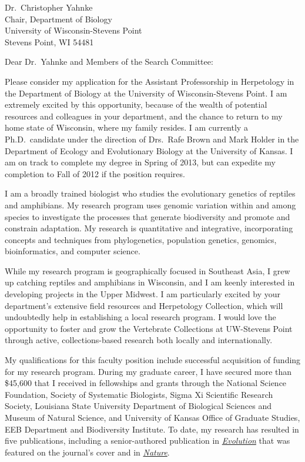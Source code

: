 \documentclass[letterpaper, 10pt]{letter}
\begin{document}
\begin{letter}{Dr.\ Christopher Yahnke \\
                     Chair, Department of Biology \\
                     University of Wisconsin-Stevens Point \\
                     Stevens Point, WI  54481}
\opening{Dear Dr.\ Yahnke and Members of the Search Committee:}
\raggedright
Please consider my application for the Assistant Professorship in Herpetology in the Department of Biology at the University of Wisconsin-Stevens Point.
I am extremely excited by this opportunity, because of the wealth of potential resources and colleagues in your department, and the chance to return to my home state of Wisconsin, where my family resides.
I am currently a Ph.D.\ candidate under the direction of Drs.\ Rafe Brown and Mark Holder in the Department of Ecology and Evolutionary Biology at the University of Kansas.
I am on track to complete my degree in Spring of 2013, but can expedite my completion to Fall of 2012 if the position requires.

I am a broadly trained biologist who studies the evolutionary genetics of reptiles and amphibians.
My research program uses genomic variation within and among species to investigate the processes that generate biodiversity and promote and constrain adaptation.
My research is quantitative and integrative, incorporating concepts and techniques from
phylogenetics, population genetics, genomics, bioinformatics, and computer science.

While my research program is geographically focused in Southeast Asia, I grew up catching reptiles and amphibians in Wisconsin, and I am keenly interested in developing projects in the Upper Midwest.
I am particularly excited by your department's extensive field resources and Herpetology Collection, which will undoubtedly help in establishing a local research program.
I would love the opportunity to foster and grow the Vertebrate Collections at UW-Stevens Point through active, collections-based research both locally and internationally.

My qualifications for this faculty position include successful acquisition of funding for my research program.
During my graduate career, I have secured more than \$45,600 that I received in fellowships and grants through the 
National Science Foundation,
Society of Systematic Biologists,
Sigma Xi Scientific Research Society,
Louisiana State University Department of Biological Sciences and Museum of Natural Science,
and University of Kansas Office of Graduate Studies, EEB Department and Biodiversity Institute.
To date, my research has resulted in five publications, including a senior-authored publication in \href{http://onlinelibrary.wiley.com/doi/10.1111/j.1558-5646.2011.01373.x/abstract}{\it Evolution} that was featured on the journal's cover and in \href{http://www.nature.com/nature/journal/v474/n7353/full/474545a.html}{\it Nature}. 


\end{letter}
\end{document}
